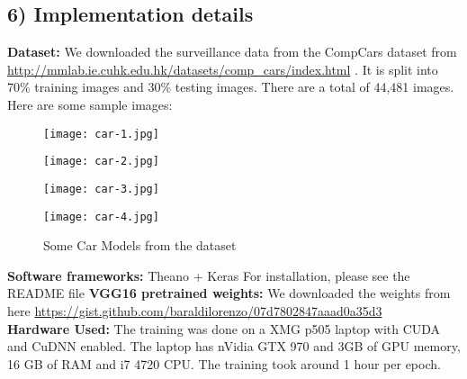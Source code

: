 \documentclass[a4paper]{article}
\begin{document}
\subsection*{6) Implementation details}
\begin{justify}
\flushleft
\textbf{Dataset:} We downloaded the surveillance data from the CompCars dataset from \url{http://mmlab.ie.cuhk.edu.hk/datasets/comp_cars/index.html} . It is split into 70\% training images and 30\% testing images. There are a total of 44,481 images. Here are some sample images:

   	\begin{figure}[H]
   		\centering
   		\hspace*{-6.7em}
   		\begin{minipage}{.5\textwidth}
   			\centering
   			\texttt{[image: car-1.jpg]}
   		\end{minipage}%
   		\hspace*{-11.7em}
   		\begin{minipage}{.5\textwidth}
   			\centering
	   		\texttt{[image: car-2.jpg]}
   		\end{minipage}%
   		\hspace*{-11.7em}
   		\begin{minipage}{.5\textwidth}
   			\centering
   			\texttt{[image: car-3.jpg]}
   		\end{minipage}%
   		\hspace*{-11.7em}
   		\begin{minipage}{.5\textwidth}
   			\centering
   			\texttt{[image: car-4.jpg]}
   		\end{minipage}
   		\caption{Some Car Models from the dataset}
   	\end{figure}

\textbf{Software frameworks:} Theano + Keras
For installation, please see the README file
\newline
\textbf{VGG16 pretrained weights:} We downloaded the weights from here \url{https://gist.github.com/baraldilorenzo/07d7802847aaad0a35d3}
\newline
\\
\textbf{Hardware Used:} The training was done on a XMG p505 laptop with CUDA and CuDNN enabled. The laptop has nVidia GTX 970 and 3GB of GPU memory, 16 GB of RAM and i7 4720 CPU. The training took around 1 hour per epoch.

\end{justify}
\end{document}
